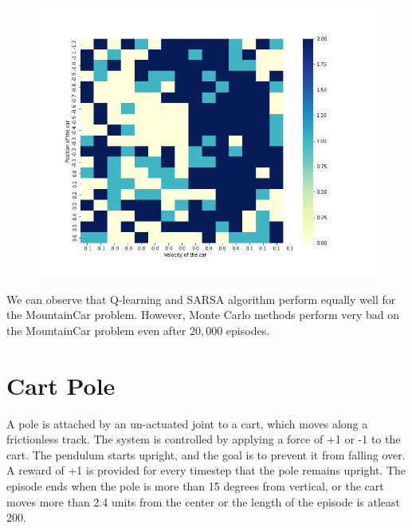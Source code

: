 \documentclass{article}
\begin{document}
\begin{figure}[H]
\begin{minipage}{.33\textwidth}
          \label{fig:test2}
        \end{minipage}
        \begin{minipage}{.33\textwidth}
        \nonumber
            \centering
            \includegraphics[width=\linewidth]{Mountaincar_qlearn_policy.png}
            \label{fig:test2}
          \end{minipage}
        \end{figure}

\noindent %
We can observe that Q-learning and SARSA algorithm perform equally well for the MountainCar problem. However, Monte Carlo methods
perform very bad on the MountainCar problem even after $20,000$ episodes. 

\section{Cart Pole}
A pole is attached by an un-actuated joint to a cart, which moves along a frictionless track. The system is controlled by applying a 
force of +1 or -1 to the cart. The pendulum starts upright, and the goal is to prevent it from falling over. A reward of +1 is provided for
every timestep that the pole remains upright. The episode ends when the pole is more than 15 degrees from vertical, or the cart moves more 
than 2.4 units from the center or the length of the episode is atleast 200.\par
\end{document}
